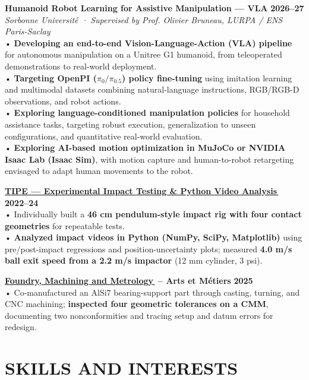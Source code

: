 \documentclass[10pt]{article}
\newcommand{\linkicon}{\,{\textcolor{linkblue}{\scriptsize\faExternalLink*}}}
\begin{document}
\textbf{Humanoid Robot Learning for Assistive Manipulation --- VLA} \hfill \textbf{2026--27}\\
\textit{Sorbonne Université · Supervised by Prof. Olivier Bruneau, LURPA / ENS Paris-Saclay}\\
• \textbf{Developing an end-to-end Vision-Language-Action (VLA) pipeline} for autonomous manipulation on a Unitree G1 humanoid, from teleoperated demonstrations to real-world deployment.\\
• \textbf{Targeting OpenPI ($\pi_0/\pi_{0.5}$) policy fine-tuning} using imitation learning and multimodal datasets combining natural-language instructions, RGB/RGB-D observations, and robot actions.\\
• \textbf{Exploring language-conditioned manipulation policies} for household assistance tasks, targeting robust execution, generalization to unseen configurations, and quantitative real-world evaluation.\\
• \textbf{Exploring AI-based motion optimization in MuJoCo or NVIDIA Isaac Lab (Isaac Sim)}, with motion capture and human-to-robot retargeting envisaged to adapt human movements to the robot.

\medskip

\textbf{\href{https://slimaneaouanouk.com/en/projects/tipe.html}{TIPE --- Experimental Impact Testing \& Python Video Analysis\linkicon}} \hfill \textbf{2022--24}\\
• Individually built a \textbf{46 cm pendulum-style impact rig with four contact geometries} for repeatable tests.\\
• \textbf{Analyzed impact videos in Python (NumPy, SciPy, Matplotlib)} using pre/post-impact regressions and position-uncertainty plots; measured \textbf{4.0 m/s ball exit speed from a 2.2 m/s impactor} (12 mm cylinder, 3 psi).

\medskip

\textbf{\href{https://slimaneaouanouk.com/en/projects/fab.html}{Foundry, Machining and Metrology\linkicon} -- Arts et Métiers} \hfill \textbf{2025}\\
• Co-manufactured an AlSi7 bearing-support part through casting, turning, and CNC machining; \textbf{inspected four geometric tolerances on a CMM}, documenting two nonconformities and tracing setup and datum errors for redesign.

\medskip

\section*{SKILLS AND INTERESTS}
\end{document}
